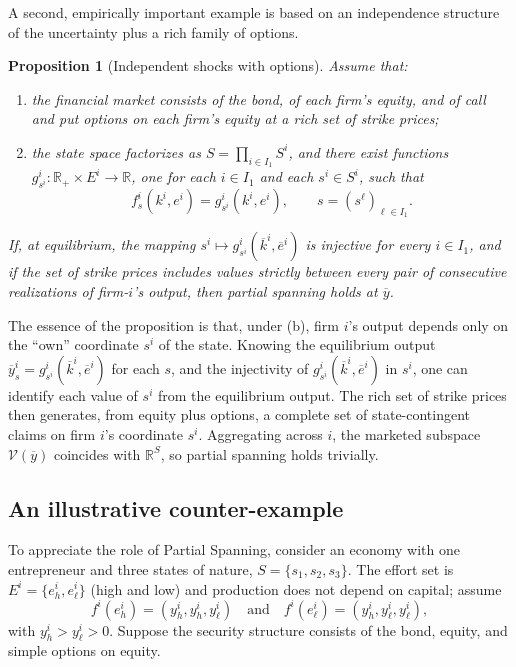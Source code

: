 \documentclass[11pt,a4paper,oneside]{book}
\def\R{\mathbb{R}}
\def\et{\quad \text{and} \quad}
\theoremstyle{plain}
\newtheorem{proposition}[theorem]{Proposition}
\theoremstyle{definition}
\theoremstyle{remark}
\numberwithin{equation}{chapter}
\begin{document}
A second, empirically important example is based on an independence structure of the uncertainty plus a rich family of options.

\begin{proposition}[Independent shocks with options]\label{prop:PS-options}
Assume that:
\begin{enumerate}
  \item[\textup{(a)}] the financial market consists of the bond, of each firm's equity, and of call and put options on each firm's equity at a rich set of strike prices;
  \item[\textup{(b)}] the state space factorizes as $S = \prod_{i \in I_1} S^i$, and there exist functions $g^i_{s^i} : \R_+ \times E^i \to \R$, one for each $i \in I_1$ and each $s^i \in S^i$, such that
  \begin{equation*}
    f^i_s(k^i, e^i) = g^i_{s^i}(k^i, e^i),
    \qquad s = (s^\ell)_{\ell \in I_1}.
  \end{equation*}
\end{enumerate}
If, at equilibrium, the mapping $s^i \mapsto g^i_{s^i}(\overline{k}^i, \overline{e}^i)$ is injective for every $i \in I_1$, and if the set of strike prices includes values strictly between every pair of consecutive realizations of firm-$i$'s output, then partial spanning holds at $\overline{y}$.
\end{proposition}

The essence of the proposition is that, under (b), firm $i$'s output depends only on the ``own'' coordinate $s^i$ of the state.
Knowing the equilibrium output $\overline{y}^i_s = g^i_{s^i}(\overline{k}^i, \overline{e}^i)$ for each $s$, and the injectivity of $g^i_{s^i}(\overline{k}^i, \overline{e}^i)$ in $s^i$, one can identify each value of $s^i$ from the equilibrium output.
The rich set of strike prices then generates, from equity plus options, a complete set of state-contingent claims on firm $i$'s coordinate $s^i$.
Aggregating across $i$, the marketed subspace $\mathcal{V}(\overline{y})$ coincides with $\R^S$, so partial spanning holds trivially.

\subsection{An illustrative counter-example}

To appreciate the role of Partial Spanning, consider an economy with one entrepreneur and three states of nature, $S = \{s_1, s_2, s_3\}$.
The effort set is $E^i = \{e^i_h, e^i_\ell\}$ (high and low) and production does not depend on capital; assume
\begin{equation*}
  f^i(e^i_h) = (y^i_h, y^i_h, y^i_\ell)
  \et
  f^i(e^i_\ell) = (y^i_h, y^i_\ell, y^i_\ell),
\end{equation*}
with $y^i_h > y^i_\ell > 0$.
Suppose the security structure consists of the bond, equity, and simple options on equity.
\end{document}
